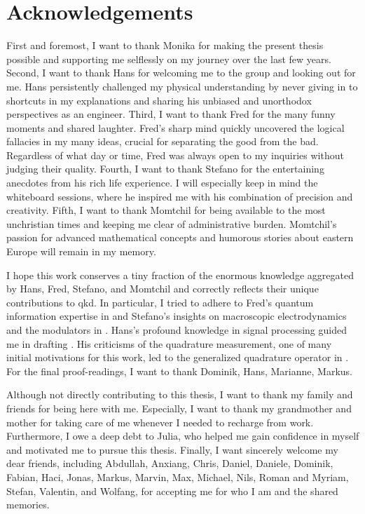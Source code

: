 
\chapter*{Acknowledgements}

First and foremost, I want to thank Monika for making the present thesis possible and supporting me selflessly on my journey over the last few years.
Second, I want to thank Hans for welcoming me to the group and looking out for me.
Hans persistently challenged my physical understanding by never giving in to shortcuts in my explanations and sharing his unbiased and unorthodox perspectives as an engineer.
Third, I want to thank Fred for the many funny moments and shared laughter.
Fred's sharp mind quickly uncovered the logical fallacies in my many ideas, crucial for separating the good from the bad.
Regardless of what day or time, Fred was always open to my inquiries without judging their quality.
Fourth, I want to thank Stefano for the entertaining anecdotes from his rich life experience.
I will especially keep in mind the whiteboard sessions, where he inspired me with his combination of precision and creativity.
Fifth, I want to thank Momtchil for being available to the most unchristian times and keeping me clear of administrative burden.
Momtchil's passion for advanced mathematical concepts and humorous stories about eastern Europe will remain in my memory.

I hope this work conserves a tiny fraction of the enormous knowledge aggregated by Hans, Fred, Stefano, and Momtchil and correctly reflects their unique contributions to \gls{qkd}.
In particular, I tried to adhere to Fred's quantum information expertise in  and Stefano's insights on macroscopic electrodynamics and the modulators in .
Hans's profound knowledge in signal processing guided me in drafting .
His criticisms of the quadrature measurement, one of many initial motivations for this work, led to the generalized quadrature operator in .
For the final proof-readings, I want to thank Dominik, Hans, Marianne, Markus.

Although not directly contributing to this thesis, I want to thank my family and friends for being here with me.
Especially, I want to thank my grandmother and mother for taking care of me whenever I needed to recharge from work.
Furthermore, I owe a deep debt to Julia, who helped me gain confidence in myself and motivated me to pursue this thesis.
Finally, I want sincerely welcome my dear friends, including Abdullah, Anxiang, Chris, Daniel, Daniele, Dominik, Fabian, Haci, Jonas, Markus, Marvin, Max, Michael, Nils, Roman and Myriam, Stefan, Valentin, and Wolfang, for accepting me for who I am and the shared memories.

